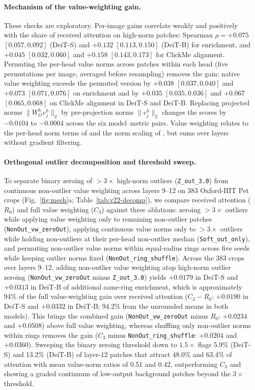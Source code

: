 \paragraph{Mechanism of the value-weighting gain.} These checks are exploratory. Per-image gains correlate weakly and positively with the share of received attention on high-norm patches: Spearman $\rho=+0.075$ $[0.057, 0.092]$ (DeiT-S) and $+0.132$ $[0.113, 0.150]$ (DeiT-B) for enrichment, and $+0.045$ $[0.032, 0.060]$ and $+0.158$ $[0.143, 0.173]$ for ClickMe alignment. Permuting the per-head value norms across patches within each head (five permutations per image, averaged before resampling) removes the gain: native value weighting exceeds the permuted version by $+0.038$ $[0.037, 0.040]$ and $+0.073$ $[0.071, 0.076]$ on enrichment and by $+0.035$ $[0.035, 0.036]$ and $+0.067$ $[0.065, 0.068]$ on ClickMe alignment in DeiT-S and DeiT-B. Replacing projected norms $\lVert W_O^h v_j^h\rVert_2$ by pre-projection norms $\lVert v_j^h\rVert_2$ changes the scores by $-0.0104$ to $-0.0004$ across the six model--metric pairs. Value weighting relates to the per-head norm terms of \citet{kobayashi2020} and the norm scaling of \citet{zhu2024}, but sums over layers without gradient filtering.

\paragraph{Orthogonal outlier decomposition and threshold sweep.} To separate binary zeroing of $>3\times$ high-norm outliers (\texttt{Z\_out\_3.0}) from continuous non-outlier value weighting across layers 9--12 on 383 Oxford-IIIT Pet crops (Fig.~\ref{fig:mech}a; Table~\ref{tab:v22-decomp}), we compare received attention ($R_0$) and full value weighting ($C_3$) against three ablations: zeroing $>3\times$ outliers while applying value weighting only to remaining non-outlier patches (\texttt{NonOut\_vw\_zeroOut}), applying continuous value norms only to $>3\times$ outliers while holding non-outliers at their per-head non-outlier median (\texttt{Soft\_out\_only}), and permuting non-outlier value norms within equal-radius rings across five seeds while keeping outlier norms fixed (\texttt{NonOut\_ring\_shuffle}). Across the 383 crops over layers 9--12, adding non-outlier value weighting atop high-norm outlier zeroing (\texttt{NonOut\_vw\_zeroOut} minus \texttt{Z\_out\_3.0}) yields $+0.0179$ in DeiT-S and $+0.0313$ in DeiT-B of additional same-ring enrichment, which is approximately 94\% of the full value-weighting gain over received attention ($C_3 - R_0$: $+0.0190$ in DeiT-S and $+0.0332$ in DeiT-B; 94.2\% from the unrounded means in both models). This brings the combined gain (\texttt{NonOut\_vw\_zeroOut} minus $R_0$: $+0.0234$ and $+0.0508$) above full value weighting, whereas shuffling only non-outlier norms within rings removes the gain ($C_3$ minus \texttt{NonOut\_ring\_shuffle}: $+0.0204$ and $+0.0360$). Sweeping the binary zeroing threshold down to $1.5\times$ flags 5.9\% (DeiT-S) and 13.2\% (DeiT-B) of layer-12 patches that attract 48.0\% and 63.4\% of attention with mean value-norm ratios of 0.51 and 0.42, outperforming $C_3$ and showing a graded continuum of low-output background patches beyond the $3\times$ threshold.

